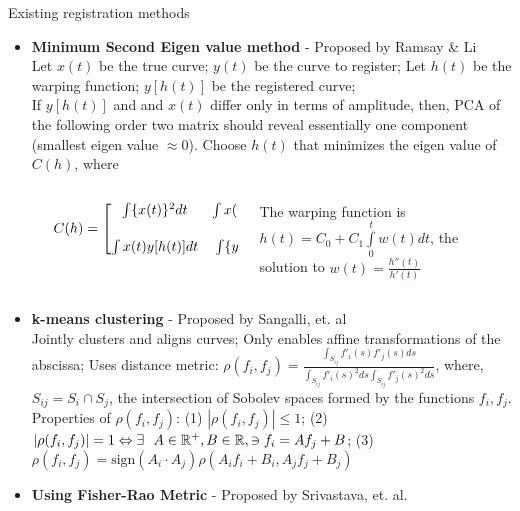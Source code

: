 \documentclass[final]{beamer}
\newlength{\sepwid}
\newlength{\onecolwid}
\begin{document}
\begin{frame}{}
\begin{columns}[t]
\begin{column}{\onecolwid}
\begin{block}{Existing registration methods}
        \begin{itemize}
          \item {\bf{Minimum Second Eigen value method}} - Proposed by Ramsay \& Li \\
            Let $x(t)$ be the true curve; $y(t)$ be the curve to register; Let $h(t)$ be the warping function; $y[h(t)]$ be the registered curve; \\
          If $y[h(t)]$ and and $x(t)$ differ only in terms of amplitude, then, PCA of the following order two matrix should reveal essentially one component (smallest eigen value $\approx 0$). Choose $h(t)$ that minimizes the eigen value of $C(h)$, where
          \begin{columns}
            \begin{column}{\sepwid}\end{column}			%
            \begin{column}{0.55\textwidth}
              $C(h) = 
              \begin{bmatrix}
                \int \{x(t) \}^2dt & \int x(t) y[h(t)]dt \vspace{0.5cm} \\ 
                \int x(t) y[h(t)]dt & \int \{y[h(t)]\}^2dt
              \end{bmatrix}$
            \end{column}
            \begin{column}{0.45\textwidth}
              The warping function is $h(t) = C_0 + C_1\int\limits_0^t w(t)dt$, the \\solution to $w(t) = \frac{h''(t)}{h'(t)}$
            \end{column}
          \end{columns}
          \item {\bf{k-means clustering}} - Proposed by Sangalli, et. al\\
            Jointly clusters and aligns curves; Only enables affine transformations of the abscissa; Uses distance metric: $ \rho(f_i, f_j) = \frac{\int _{S_{ij}}f'_i(s)f'_j(s) ds}{\int _{S_{ij}}f'_i(s)^2 ds \int _{S_{ij}}f'_j(s)^2 ds} $, where, $S_{ij} = S_i \cap S_j$, the intersection of Sobolev spaces formed by the functions $f_i, f_j$. Properties of $\rho(f_i, f_j)$: (1) $|\rho(f_i, f_j)| \leq 1$; (2) $|\rho(f_i, f_j)| = 1 \Leftrightarrow \exists \ \ A \in \mathbb{R} ^+, B \in \mathbb{R}, \ni f_i = Af_j + B$; (3) $\rho(f_i, f_j) = \text{sign}(A_i\cdot A_j) \rho(A_if_i + B_i, A_jf_j + B_j)$
          \item {\bf{Using Fisher-Rao Metric}} - Proposed by Srivastava, et. al. \\

\end{itemize}
\end{block}
\end{column}
\end{columns}
\end{frame}
\end{document}

